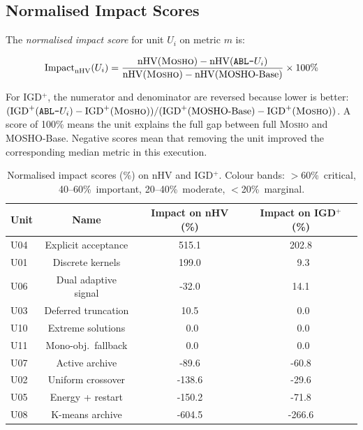 \documentclass[11pt,a4paper]{article}
\newcommand{\mosho}{\textsc{Mosho}}
\newcommand{\ablof}[1]{\texttt{ABL-#1}}
\begin{document}
\subsection{Normalised Impact Scores}
\label{sec:impact_norm}

The \emph{normalised impact score} for unit $U_i$ on metric $m$ is:

\begin{equation}
  \mathrm{Impact}_{\mathrm{nHV}}(U_i) =
  \frac{\mathrm{nHV}(\text{\mosho{}}) - \mathrm{nHV}(\text{\ablof{$U_i$}})}
       {\mathrm{nHV}(\text{\mosho{}}) - \mathrm{nHV}(\text{MOSHO-Base})}
  \times 100\%
  \label{eq:impact}
\end{equation}

\noindent For IGD$^+$, the numerator and denominator are reversed because
lower is better:
$(\mathrm{IGD}^+(\text{\ablof{$U_i$}})-\mathrm{IGD}^+(\text{\mosho{}})) /
(\mathrm{IGD}^+(\text{MOSHO-Base})-\mathrm{IGD}^+(\text{\mosho{}}))$.
A score of 100\% means the unit explains the full gap between full
\mosho{} and MOSHO-Base.  Negative scores mean that removing the unit
improved the corresponding median metric in this execution.

\begin{table}[H]
\centering
\caption{Normalised impact scores (\%) on nHV and IGD$^+$.
  Colour bands:
  \colorbox{critred!25}{$>$60\%~critical},
  \colorbox{imptorange!25}{40--60\%~important},
  \colorbox{modblue!20}{20--40\%~moderate},
  \colorbox{marggreen!20}{$<$20\%~marginal}.}
\label{tab:impact}
\renewcommand{\arraystretch}{1.25}
\setlength{\tabcolsep}{10pt}
\begin{tabular}{l c c c}
\toprule
\textbf{Unit} & \textbf{Name} &
  \textbf{Impact on nHV (\%)} &
  \textbf{Impact on IGD}$^+$ \textbf{(\%)} \\
\midrule
U04 & Explicit acceptance  & \cellcolor{critred!25}515.1 & \cellcolor{critred!25}202.8 \\
U01 & Discrete kernels     & \cellcolor{critred!25}199.0 & \cellcolor{marggreen!20}~9.3 \\
U06 & Dual adaptive signal & \cellcolor{marggreen!20}-32.0 & \cellcolor{marggreen!20}14.1 \\
U03 & Deferred truncation  & \cellcolor{marggreen!20}10.5 & \cellcolor{marggreen!20}~0.0 \\
U10 & Extreme solutions    & \cellcolor{marggreen!20}~0.0 & \cellcolor{marggreen!20}~0.0 \\
U11 & Mono-obj.\ fallback  & \cellcolor{marggreen!20}~0.0 & \cellcolor{marggreen!20}~0.0 \\
U07 & Active archive       & \cellcolor{marggreen!20}-89.6 & \cellcolor{marggreen!20}-60.8 \\
U02 & Uniform crossover    & \cellcolor{marggreen!20}-138.6 & \cellcolor{marggreen!20}-29.6 \\
U05 & Energy + restart     & \cellcolor{marggreen!20}-150.2 & \cellcolor{marggreen!20}-71.8 \\
U08 & K-means archive      & \cellcolor{marggreen!20}-604.5 & \cellcolor{marggreen!20}-266.6 \\
\bottomrule
\end{tabular}
\end{table}
\end{document}
